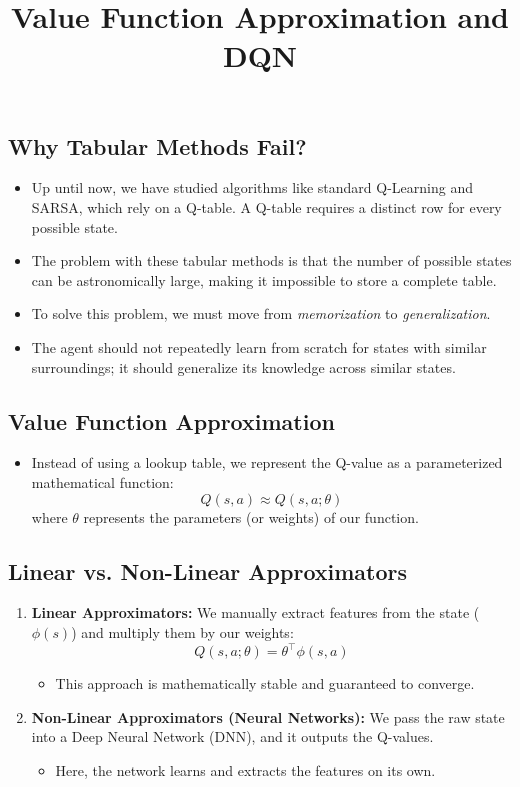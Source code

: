 \documentclass[12pt]{article}
\title{\textbf{Value Function Approximation and DQN}}
\author{}
\date{}
\begin{document}
\maketitle

\subsection*{Why Tabular Methods Fail?}
\begin{itemize}[label=$\bullet$]
    \item Up until now, we have studied algorithms like standard Q-Learning and SARSA, which rely on a Q-table. A Q-table requires a distinct row for every possible state.
    \item The problem with these tabular methods is that the number of possible states can be astronomically large, making it impossible to store a complete table.
    \item To solve this problem, we must move from \textit{memorization} to \textit{generalization}.
    \item The agent should not repeatedly learn from scratch for states with similar surroundings; it should generalize its knowledge across similar states.
\end{itemize}

\subsection*{Value Function Approximation}
\begin{itemize}[label=$\bullet$]
    \item Instead of using a lookup table, we represent the Q-value as a parameterized mathematical function:
    $$Q(s, a) \approx Q(s, a; \theta)$$
    where $\theta$ represents the parameters (or weights) of our function.
\end{itemize}

\subsection*{Linear vs. Non-Linear Approximators}
\begin{enumerate}
    \item \textbf{Linear Approximators:} We manually extract features from the state ($\phi(s)$) and multiply them by our weights: 
    $$Q(s, a; \theta) = \theta^\top \phi(s, a)$$
    \begin{itemize}[label=$\bullet$]
        \item This approach is mathematically stable and guaranteed to converge.
    \end{itemize}
    \item \textbf{Non-Linear Approximators (Neural Networks):} We pass the raw state into a Deep Neural Network (DNN), and it outputs the Q-values.
    \begin{itemize}[label=$\bullet$]
        \item Here, the network learns and extracts the features on its own.
    \end{itemize}
\end{enumerate}
\end{document}
